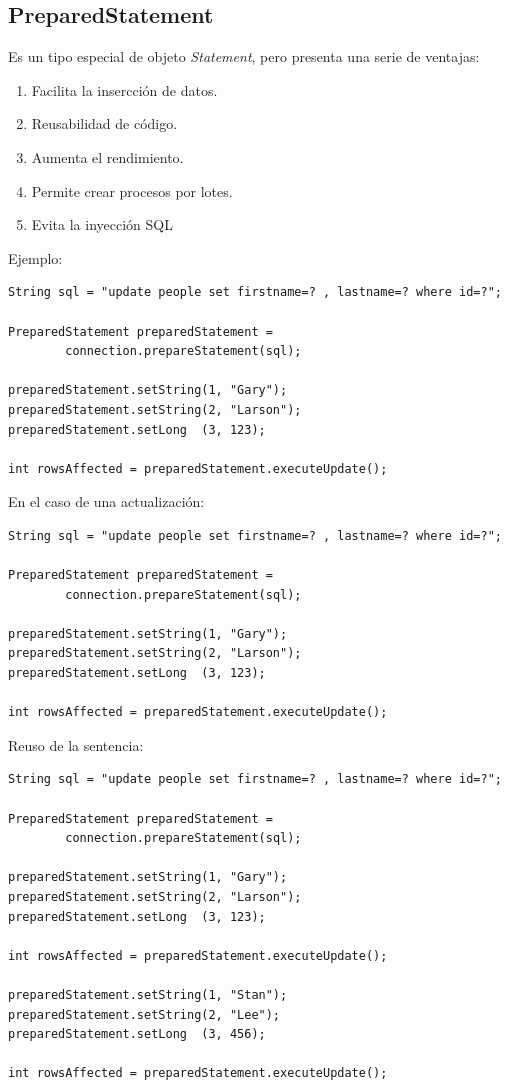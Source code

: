 \documentclass[4paper]{article}
\begin{document}
\subsection{PreparedStatement}
Es un tipo especial de objeto \emph{Statement}, pero presenta una serie de ventajas:
\begin{enumerate}
\item Facilita la insercción de datos.
\item Reusabilidad de código.
\item Aumenta el rendimiento.
\item Permite crear procesos por lotes.
\item Evita la inyección SQL
\end{enumerate}

Ejemplo:
\begin{lstlisting}
String sql = "update people set firstname=? , lastname=? where id=?";

PreparedStatement preparedStatement =
        connection.prepareStatement(sql);

preparedStatement.setString(1, "Gary");
preparedStatement.setString(2, "Larson");
preparedStatement.setLong  (3, 123);

int rowsAffected = preparedStatement.executeUpdate();
\end{lstlisting}
En el caso de una actualización:
\begin{lstlisting}
String sql = "update people set firstname=? , lastname=? where id=?";

PreparedStatement preparedStatement =
        connection.prepareStatement(sql);

preparedStatement.setString(1, "Gary");
preparedStatement.setString(2, "Larson");
preparedStatement.setLong  (3, 123);

int rowsAffected = preparedStatement.executeUpdate();
\end{lstlisting}
Reuso de la sentencia:
\begin{lstlisting}
String sql = "update people set firstname=? , lastname=? where id=?";

PreparedStatement preparedStatement =
        connection.prepareStatement(sql);

preparedStatement.setString(1, "Gary");
preparedStatement.setString(2, "Larson");
preparedStatement.setLong  (3, 123);

int rowsAffected = preparedStatement.executeUpdate();

preparedStatement.setString(1, "Stan");
preparedStatement.setString(2, "Lee");
preparedStatement.setLong  (3, 456);

int rowsAffected = preparedStatement.executeUpdate();
\end{lstlisting}
\end{document}
